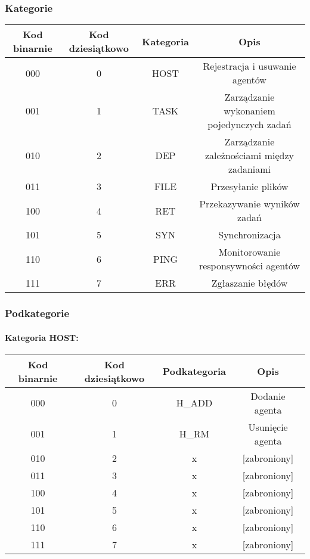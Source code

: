 \documentclass[10pt,a4paper]{article}
\begin{document}
	        \subsubsection{Kategorie}
		        \begin{tabular}{ c | c | c | c }
				    \textbf{Kod binarnie} & \textbf{Kod dziesiątkowo} & \textbf{Kategoria} & \textbf{Opis} \\
				    \hline
				    000 & 0 & HOST & Rejestracja i usuwanie agentów \\
				    001 & 1 & TASK & Zarządzanie wykonaniem pojedynczych zadań \\
				    010 & 2 & DEP & Zarządzanie zależnościami między zadaniami \\
				    011 & 3 & FILE & Przesyłanie plików \\
				    100 & 4 & RET & Przekazywanie wyników zadań \\
				    101 & 5 & SYN & Synchronizacja \\
				    110 & 6 & PING & Monitorowanie responsywności agentów \\
				    111 & 7 & ERR & Zgłaszanie błędów \\
				\end{tabular}
					
			\subsubsection{Podkategorie}
			
			 \paragraph{Kategoria HOST:\\}
			    
		        \begin{tabular}{ c | c | c | c }
				    \textbf{Kod binarnie} & \textbf{Kod dziesiątkowo} & \textbf{Podkategoria} & \textbf{Opis} \\
				    \hline
				    000 & 0 & H\_ADD & Dodanie agenta \\
				    001 & 1 & H\_RM & Usunięcie agenta \\
				    010 & 2 & x & [zabroniony] \\
				    011 & 3 & x & [zabroniony] \\
				    100 & 4 & x & [zabroniony] \\
				    101 & 5 & x & [zabroniony] \\
				    110 & 6 & x & [zabroniony] \\
				    111 & 7 & x & [zabroniony] \\
				\end{tabular}
				
\end{document}
